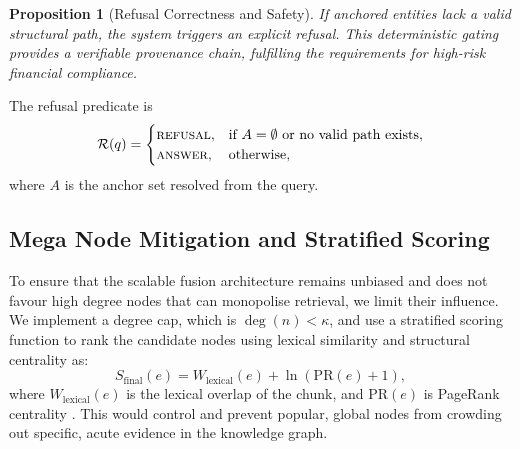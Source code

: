 \documentclass[conference]{IEEEtran}
\newtheorem{proposition}{Proposition}
\begin{document}
\begin{proposition}[Refusal Correctness and Safety]
If anchored entities lack a valid structural path, the system triggers an explicit refusal. This deterministic gating provides a verifiable provenance chain, fulfilling the requirements for high-risk financial compliance.
\end{proposition}

The refusal predicate is
\begin{equation}
  \mathcal{R}(q) =
  \begin{cases}
    \textsc{refusal}, & \text{if } A = \emptyset \text{ or no valid path exists},\\
    \textsc{answer}, & \text{otherwise},
  \end{cases}
\end{equation}
where $A$ is the anchor set resolved from the query.

\subsection{Mega Node Mitigation and Stratified Scoring}
To ensure that the scalable fusion architecture remains unbiased and does not favour high degree nodes that can monopolise retrieval, we limit their influence. We implement a degree cap, which is $\deg(n) < \kappa$, and use a stratified scoring function to rank the candidate nodes using lexical similarity and structural centrality as:
\begin{equation}
  S_{\mathrm{final}}(e) = W_{\mathrm{lexical}}(e) + \ln(\mathrm{PR}(e) + 1),
\end{equation}
where $W_{\mathrm{lexical}}(e)$ is the lexical overlap of the chunk, and $\mathrm{PR}(e)$ is PageRank centrality \cite{angles2018propertygraphs}. This would control and prevent popular, global nodes from crowding out specific, acute evidence in the knowledge graph.
\end{document}
